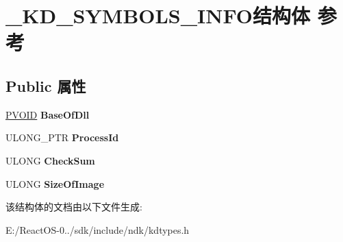 \hypertarget{struct___k_d___s_y_m_b_o_l_s___i_n_f_o}{}\section{\+\_\+\+K\+D\+\_\+\+S\+Y\+M\+B\+O\+L\+S\+\_\+\+I\+N\+F\+O结构体 参考}
\label{struct___k_d___s_y_m_b_o_l_s___i_n_f_o}
\subsection*{Public 属性}
\begin{DoxyCompactItemize}
\item 
\mbox{\label{struct___k_d___s_y_m_b_o_l_s___i_n_f_o_ad595e4791c839ab48f17525c1b3c7e51}} 
\hyperlink{interfacevoid}{P\+V\+O\+ID} {\bfseries Base\+Of\+Dll}
\item 
\mbox{\label{struct___k_d___s_y_m_b_o_l_s___i_n_f_o_a58daf71d48388545c1029ce0475758d2}} 
U\+L\+O\+N\+G\+\_\+\+P\+TR {\bfseries Process\+Id}
\item 
\mbox{\label{struct___k_d___s_y_m_b_o_l_s___i_n_f_o_a9eb16393e01d1e6d1920e5b397371198}} 
U\+L\+O\+NG {\bfseries Check\+Sum}
\item 
\mbox{\label{struct___k_d___s_y_m_b_o_l_s___i_n_f_o_a95ab3158f2e9b0f9605afe46698d1f3e}} 
U\+L\+O\+NG {\bfseries Size\+Of\+Image}
\end{DoxyCompactItemize}


该结构体的文档由以下文件生成\+:\begin{DoxyCompactItemize}
\item 
E\+:/\+React\+O\+S-\/0../sdk/include/ndk/kdtypes.\+h\end{DoxyCompactItemize}
